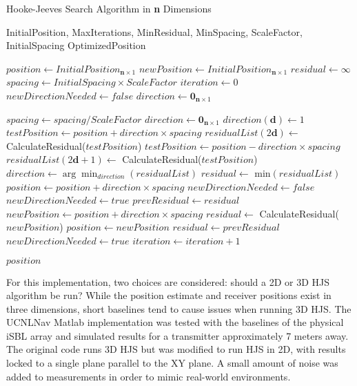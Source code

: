 \documentclass[12pt,a4paper]{report}
\begin{document}
\begin{algorithm}
	\caption{Hooke-Jeeves Search Algorithm in \textbf{n} Dimensions} \label{alg:hooke-jeeves-3d}
	\begin{algorithmic}[1]
		\Require InitialPosition, MaxIterations, MinResidual, MinSpacing, ScaleFactor, InitialSpacing
		\Ensure OptimizedPosition
		
		\State $position \gets InitialPosition_{\mathbf{n} \times 1}$
		\State $newPosition \gets InitialPosition_{\mathbf{n} \times 1}$
		\State $residual \gets \infty$
		\State $spacing \gets InitialSpacing \times ScaleFactor$
		\State $iteration \gets 0$
		\State $newDirectionNeeded \gets false$
		\State $direction \gets \mathbf{0}_{\mathbf{n} \times 1}$
		
		\State $spacing \gets spacing / ScaleFactor$
		\State $direction \gets \mathbf{0}_{\mathbf{n} \times 1}$
		\State $direction(\mathbf{d}) \gets 1$
		\State $testPosition \gets position + direction \times spacing$
		\State $residualList(2\mathbf{d}) \gets$ CalculateResidual($testPosition$)
		\State $testPosition \gets position - direction \times spacing$
		\State $residualList(2\mathbf{d}+1) \gets$ CalculateResidual($testPosition$)
		\EndFor
		\State $direction \gets \arg\!\min_{direction}(residualList)$
		\State $residual \gets$ min$(residualList)$
		\State $position \gets position + direction \times spacing$
		\State $newDirectionNeeded \gets false$
		\Else
		\State $newDirectionNeeded \gets true$
		\EndIf
		\Else
		\State $prevResidual \gets residual$
		\State $newPosition \gets position + direction \times spacing$
		\State $residual \gets$ CalculateResidual($newPosition$)
		\State $position \gets newPosition$
		\Else
		\State $residual \gets prevResidual$
		\State $newDirectionNeeded \gets true$
		\EndIf
		\EndIf
		\State $iteration \gets iteration + 1$
		\EndWhile
		
		\Return $position$
	\end{algorithmic}
\end{algorithm}

For this implementation, two choices are considered: should a 2D or 3D HJS algorithm be run? While the position estimate and receiver positions exist in three dimensions, short baselines tend to cause issues when running 3D HJS. The UCNLNav Matlab implementation was tested with the baselines of the physical iSBL array and simulated results for a transmitter approximately 7 meters away. The original code runs 3D HJS but was modified to run HJS in 2D, with results locked to a single plane parallel to the XY plane. A small amount of noise was added to measurements in order to mimic real-world environments. 
\end{document}
